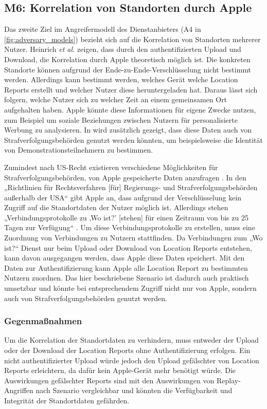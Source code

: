 \subsection[M6]{M6: Korrelation von Standorten durch Apple}
\label{missbrauch:6}

Das zweite Ziel im Angreifermodell des Dienstanbieters (A4 in \autoref{fig:adversary_models}) bezieht sich auf die Korrelation von Standorten mehrerer Nutzer.
Heinrich \textit{et al.} \cite{Heinrich_FindMy} zeigen, dass durch den authentifizierten Upload und Download, die Korrelation durch Apple theoretisch möglich ist.
Die konkreten Standorte können aufgrund der Ende-zu-Ende-Verschlüsselung nicht bestimmt werden.
Allerdings kann bestimmt werden, welches Gerät welche Location Reports erstellt und welcher Nutzer diese heruntergeladen hat.
Daraus lässt sich folgern, welche Nutzer sich zu welcher Zeit an einem gemeinsamen Ort aufgehalten haben.
Apple könnte diese Informationen für eigene Zwecke nutzen, zum Beispiel um soziale Beziehungen zwischen Nutzern für personalisierte Werbung zu analysieren.
In \cite{Heinrich_FindMy} wird zusätzlich gezeigt, dass diese Daten auch von Strafverfolgungsbehörden genutzt werden könnten, um beispielsweise die Identität von Demonstrationsteilnehmern zu bestimmen.

Zumindest nach US-Recht existieren verschiedene Möglichkeiten für Strafverfolgungsbehörden, von Apple gespeicherte Daten anzufragen \cite{Data_Access}.
In den „Richtlinien für Rechtsverfahren [für] Regierungs- und Strafverfolgungsbehörden außerhalb der USA“ \cite{Apple_FindMy_Data} gibt Apple an, dass aufgrund der Verschlüsselung kein Zugriff auf die Standortdaten der Nutzer möglich ist.
Allerdings stehen „Verbindungsprotokolle zu ‚Wo ist?’ [stehen] für einen Zeitraum von bis zu 25 Tagen zur Verfügung“ \cite{Apple_FindMy_Data}.
Um diese Verbindungsprotokolle zu erstellen, muss eine Zuordnung von Verbindungen zu Nutzern stattfinden.
Da Verbindungen zum „Wo ist?“ Dienst nur beim Upload oder Download von Location Reports entstehen, kann davon ausgegangen werden, dass Apple diese Daten speichert.
Mit den Daten zur Authentifizierung kann Apple alle Location Report zu bestimmten Nutzern zuordnen.
Das hier beschriebene Szenario ist dadurch auch praktisch umsetzbar und könnte bei entsprechendem Zugriff nicht nur von Apple, sondern auch von Strafverfolgungsbehörden genutzt werden.


\subsubsection{Gegenmaßnahmen}
Um die Korrelation der Standortdaten zu verhindern, muss entweder der Upload oder der Download der Location Reports ohne Authentifizierung erfolgen.
Ein nicht authentifizierter Upload würde jedoch den Upload gefälschter von Location Reports erleichtern, da dafür kein Apple-Gerät mehr benötigt würde.
Die Auswirkungen gefälschter Reports sind mit den Auswirkungen von Replay-Angriffen nach Szenario  vergleichbar und könnten die Verfügbarkeit und Integrität der Standortdaten gefährden.

